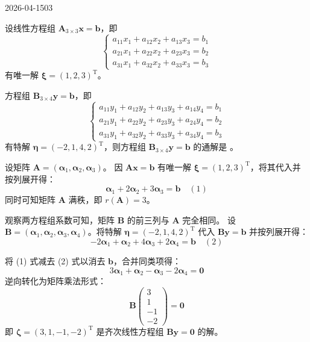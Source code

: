 \begin{mistake}{2026-04-15}{03}

\begin{problemcontent}
设线性方程组 \(\boldsymbol{A}_{3\times3}\boldsymbol{x} = \boldsymbol{b}\)，即
\[
\begin{cases}
a_{11}x_1 + a_{12}x_2 + a_{13}x_3 = b_1 \\
a_{21}x_1 + a_{22}x_2 + a_{23}x_3 = b_2 \\
a_{31}x_1 + a_{32}x_2 + a_{33}x_3 = b_3
\end{cases}
\]
有唯一解 \(\boldsymbol{\xi} = (1,2,3)^{\mathrm{T}}\)。

方程组 \(\boldsymbol{B}_{3\times4}\boldsymbol{y} = \boldsymbol{b}\)，即
\[
\begin{cases}
a_{11}y_1 + a_{12}y_2 + a_{13}y_3 + a_{14}y_4 = b_1 \\
a_{21}y_1 + a_{22}y_2 + a_{23}y_3 + a_{24}y_4 = b_2 \\
a_{31}y_1 + a_{32}y_2 + a_{33}y_3 + a_{34}y_4 = b_3
\end{cases}
\]
有特解 \(\boldsymbol{\eta} = (-2,1,4,2)^{\mathrm{T}}\)，则方程组 \(\boldsymbol{B}_{3\times4}\boldsymbol{y} = \boldsymbol{b}\) 的通解是 \underline{\qquad\qquad}。
\end{problemcontent}

\begin{solutioncontent}
设矩阵 \(\boldsymbol{A} = (\boldsymbol{\alpha}_1, \boldsymbol{\alpha}_2, \boldsymbol{\alpha}_3)\)。
因 \(\boldsymbol{A}\boldsymbol{x}=\boldsymbol{b}\) 有唯一解 \(\boldsymbol{\xi} = (1,2,3)^{\mathrm{T}}\)，将其代入并按列展开得：
\[ \boldsymbol{\alpha}_1 + 2\boldsymbol{\alpha}_2 + 3\boldsymbol{\alpha}_3 = \boldsymbol{b} \quad (1) \]
同时可知矩阵 \(\boldsymbol{A}\) 满秩，即 \(r(\boldsymbol{A}) = 3\)。

观察两方程组系数可知，矩阵 \(\boldsymbol{B}\) 的前三列与 \(\boldsymbol{A}\) 完全相同。
设 \(\boldsymbol{B} = (\boldsymbol{\alpha}_1, \boldsymbol{\alpha}_2, \boldsymbol{\alpha}_3, \boldsymbol{\alpha}_4)\)。将特解 \(\boldsymbol{\eta} = (-2,1,4,2)^{\mathrm{T}}\) 代入 \(\boldsymbol{B}\boldsymbol{y}=\boldsymbol{b}\) 并按列展开得：
\[ -2\boldsymbol{\alpha}_1 + \boldsymbol{\alpha}_2 + 4\boldsymbol{\alpha}_3 + 2\boldsymbol{\alpha}_4 = \boldsymbol{b} \quad (2) \]

将 (1) 式减去 (2) 式以消去 \(\boldsymbol{b}\)，合并同类项得：
\[ 3\boldsymbol{\alpha}_1 + \boldsymbol{\alpha}_2 - \boldsymbol{\alpha}_3 - 2\boldsymbol{\alpha}_4 = \boldsymbol{0} \]
逆向转化为矩阵乘法形式：
\[ \boldsymbol{B} \begin{pmatrix} 3 \\ 1 \\ -1 \\ -2 \end{pmatrix} = \boldsymbol{0} \]
即 \(\boldsymbol{\zeta} = (3, 1, -1, -2)^{\mathrm{T}}\) 是齐次线性方程组 \(\boldsymbol{B}\boldsymbol{y}=\boldsymbol{0}\) 的解。


\end{solutioncontent}
\end{mistake}
